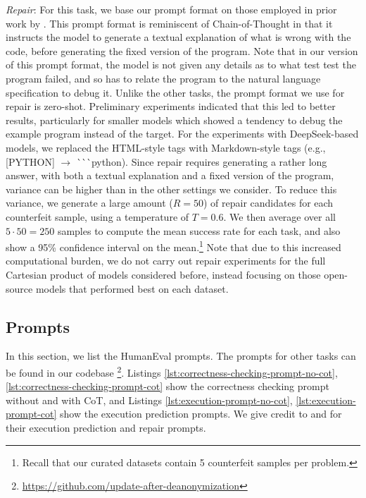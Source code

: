 \textit{Repair}: For this task, we base our prompt format on those employed in prior work by \citet{olausson2024repair}.
This prompt format is reminiscent of Chain-of-Thought in that it instructs the model to generate a textual explanation of what is wrong with the code, before generating the fixed version of the program.
Note that in our version of this prompt format, the model is not given any details as to what test test the program failed, and so has to relate the program to the natural language specification to debug it.
Unlike the other tasks, the prompt format we use for repair is zero-shot. 
Preliminary experiments indicated that this led to better results, particularly for smaller models which showed a tendency to debug the example program instead of the target. For the experiments with DeepSeek-based models, we replaced the HTML-style tags with Markdown-style tags (e.g., [PYTHON] $\to$ \`{}\`{}\`{}python).
Since repair requires generating a rather long answer, with both a textual explanation and a fixed version of the program, variance can be higher than in the other settings we consider.
To reduce this variance, we generate a large amount ($R=50$) of repair candidates for each counterfeit sample, using a temperature of $T=0.6$. We then average over all $5 \cdot 50 = 250$ samples to compute the mean success rate for each task, and also show a 95\% confidence interval on the mean.\footnote{Recall that our curated datasets contain 5 counterfeit samples per problem.}
Note that due to this increased computational burden, we do not carry out repair experiments for the full Cartesian product of models considered before, instead focusing on those open-source models that performed best on each dataset.

\subsection{Prompts}
\label{sec:prompts}
In this section, we list the HumanEval prompts. The prompts for other tasks can be found in our codebase \footnote{\url{https://github.com/update-after-deanonymization}}. Listings \ref{lst:correctness-checking-prompt-no-cot}, \ref{lst:correctness-checking-prompt-cot} show the correctness checking prompt without and with CoT, and Listings \ref{lst:execution-prompt-no-cot}, \ref{lst:execution-prompt-cot} show the execution prediction prompts. We give credit to \citet{gu2024cruxeval} and \citet{olausson2024repair} for their execution prediction and repair prompts.

